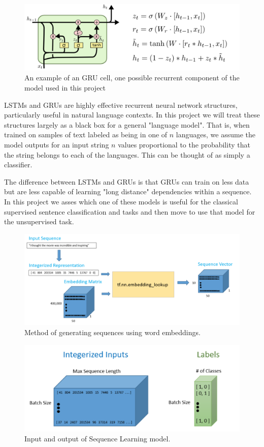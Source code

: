 \documentclass[11pt,letterpaper]{article}
\begin{document}
\begin{figure}
	\includegraphics[scale = .35]{lstmcell}
	\caption{An example of an GRU cell, one possible recurrent component of the model used in this project \cite{lstm:15}}
\end{figure}

LSTMs \cite{hochreiter1997long} and GRUs are highly effective recurrent neural network structures, particularly useful in natural language contexts. \cite{Sundermeyer:12}  In this project we will treat these structures largely as a black box for a general "language model". That is, when trained on samples of text labeled as being in one of $n$ languages, we assume the model outputs for an input string $n$ values proportional to the probability that the string belongs to each of the languages. This can be thought of as simply a classifier.

The difference between LSTMs and GRUs is that GRUs can train on less data but are less capable of learning "long distance" dependencies within a sequence. \cite{lstm:15} In this project we asses which one of these models is useful for the classical supervised sentence classification and tasks and then  move to use that model for the unsupervised task.

\begin{figure}
	\includegraphics[scale = .23]{embeddings.png}
	\caption{Method of generating sequences using word embeddings.}
\end{figure}

\begin{figure}
	\includegraphics[scale = .27]{LSTM}
	\caption{Input and output of Sequence Learning model.}
\end{figure}
\end{document}
